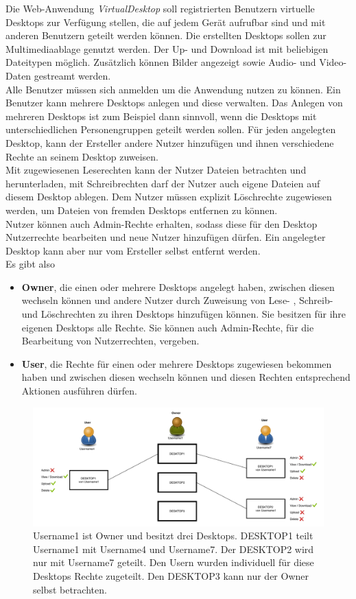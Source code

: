 \documentclass[a4paper, 12pt]{scrreprt}
\renewcommand\_{\textunderscore\allowbreak}
\begin{document}
Die Web-Anwendung \textit{VirtualDesktop} soll registrierten Benutzern virtuelle Desktops zur Verfügung stellen, die auf jedem Gerät aufrufbar sind und mit anderen Benutzern geteilt werden können. Die erstellten Desktops sollen zur Multimediaablage genutzt werden. Der Up- und Download ist mit beliebigen Dateitypen möglich. Zusätzlich können Bilder angezeigt sowie Audio- und Video-Daten gestreamt werden.\\[0.25cm]
Alle Benutzer müssen sich anmelden um die Anwendung nutzen zu können. Ein Benutzer kann mehrere Desktops anlegen und diese verwalten. Das Anlegen von mehreren Desktops ist zum Beispiel dann sinnvoll, wenn die Desktops mit unterschiedlichen Personengruppen geteilt werden sollen.
Für jeden angelegten Desktop, kann der Ersteller andere Nutzer hinzufügen und ihnen verschiedene Rechte an seinem Desktop zuweisen.\\
Mit zugewiesenen Leserechten kann der Nutzer Dateien betrachten und herunterladen, mit Schreibrechten darf der Nutzer auch eigene Dateien auf diesem Desktop ablegen. Dem Nutzer müssen explizit Löschrechte zugewiesen werden, um Dateien von fremden Desktops entfernen zu können.\\
Nutzer können auch Admin-Rechte erhalten, sodass diese für den Desktop Nutzerrechte bearbeiten und neue Nutzer hinzufügen dürfen. Ein angelegter Desktop kann aber nur vom Ersteller selbst entfernt werden.\\ 
Es gibt also
\begin{itemize} 
\item[] \textbf{Owner}, die einen oder mehrere Desktops angelegt haben, zwischen diesen wechseln können und andere Nutzer durch Zuweisung von Lese- , Schreib- und Löschrechten zu ihren Desktops hinzufügen können. Sie besitzen für ihre eigenen Desktops alle Rechte. Sie können auch Admin-Rechte, für die Bearbeitung von Nutzerrechten, vergeben.
\item[] \textbf{User}, die Rechte für einen oder mehrere Desktops zugewiesen bekommen haben und zwischen diesen wechseln können und diesen Rechten entsprechend Aktionen ausführen dürfen.
\end{itemize} 

\begin{figure}[h]
\centering
\includegraphics[scale=0.45]{VD_konzept.pdf}
\caption{Username1 ist Owner und besitzt drei Desktops. DESKTOP1 teilt Username1 mit Username4 und Username7. Der DESKTOP2 wird nur mit Username7 geteilt. Den Usern wurden individuell für diese Desktops Rechte zugeteilt. Den DESKTOP3 kann nur der Owner selbst betrachten.}
\end{figure}
\end{document}
